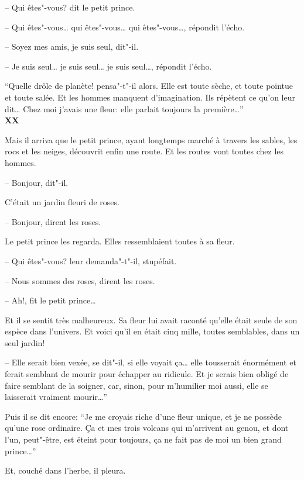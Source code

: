 \begin{Parallel}[p]{}{}
{-- Qui êtes"-vous? dit le petit prince.

-- Qui êtes"-vous\ldots{} qui êtes"-vous\ldots{} qui êtes"-vous\ldots{},
répondit l'écho.

-- Soyez mes amis, je suis seul, dit"-il.

-- Je suis seul\ldots{} je suis seul\ldots{} je suis seul\ldots{}, répondit l'écho.

``Quelle drôle de planète! pensa"-t"-il alors. Elle est
toute sèche, et toute pointue et toute salée. Et les
hommes manquent d'imagination. Ils répètent ce
qu'on leur dit\ldots{} Chez moi j'avais une fleur: elle
parlait toujours la première\ldots{}''\\

\textbf{XX}

Mais il arriva que le petit prince, ayant longtemps
marché à travers les sables, les rocs et les neiges,
découvrit enfin une route. Et les routes vont toutes
chez les hommes.

-- Bonjour, dit"-il.

C'était un jardin fleuri de roses.

-- Bonjour, dirent les roses.

Le petit prince les regarda. Elles ressemblaient
toutes à sa fleur.

-- Qui êtes"-vous? leur demanda"-t"-il, stupéfait.

-- Nous sommes des roses, dirent les roses.

-- Ah!, fit le petit prince\ldots{}

Et il se sentit très malheureux. Sa fleur lui avait
raconté qu'elle était seule de son espèce dans l'univers. Et voici qu'il en était cinq mille, toutes semblables, dans un seul jardin!

-- Elle serait bien vexée, se dit"-il, si elle voyait ça\ldots{} elle tousserait énormément et ferait semblant de
mourir pour échapper au ridicule. Et je serais bien
obligé de faire semblant de la soigner, car, sinon,
pour m'humilier moi aussi, elle se laisserait vraiment mourir\ldots{}''

Puis il se dit encore: ``Je me croyais riche d'une
fleur unique, et je ne possède qu'une rose ordinaire. Ça et mes trois volcans qui m'arrivent au
genou, et dont l'un, peut"-être, est éteint pour toujours, ça ne fait pas de moi un bien grand prince\ldots{}''

Et, couché dans l'herbe, il pleura.\\
}


\end{Parallel}
